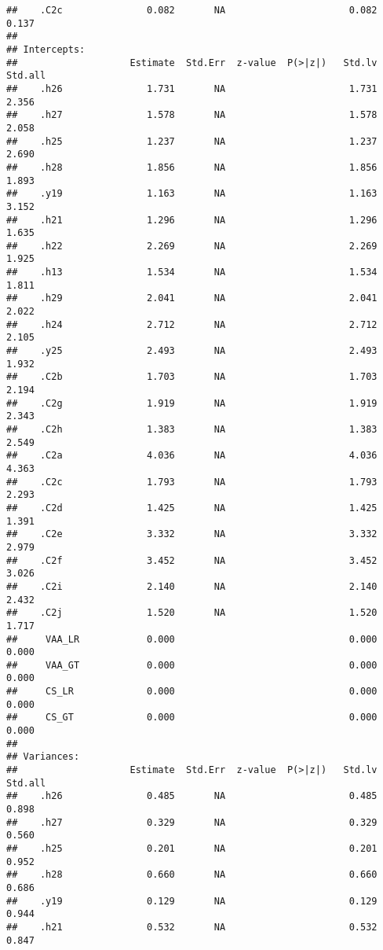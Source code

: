 \documentclass[
]{article}
\begin{document}
\begin{verbatim}
##    .C2c               0.082       NA                      0.082    0.137
## 
## Intercepts:
##                    Estimate  Std.Err  z-value  P(>|z|)   Std.lv  Std.all
##    .h26               1.731       NA                      1.731    2.356
##    .h27               1.578       NA                      1.578    2.058
##    .h25               1.237       NA                      1.237    2.690
##    .h28               1.856       NA                      1.856    1.893
##    .y19               1.163       NA                      1.163    3.152
##    .h21               1.296       NA                      1.296    1.635
##    .h22               2.269       NA                      2.269    1.925
##    .h13               1.534       NA                      1.534    1.811
##    .h29               2.041       NA                      2.041    2.022
##    .h24               2.712       NA                      2.712    2.105
##    .y25               2.493       NA                      2.493    1.932
##    .C2b               1.703       NA                      1.703    2.194
##    .C2g               1.919       NA                      1.919    2.343
##    .C2h               1.383       NA                      1.383    2.549
##    .C2a               4.036       NA                      4.036    4.363
##    .C2c               1.793       NA                      1.793    2.293
##    .C2d               1.425       NA                      1.425    1.391
##    .C2e               3.332       NA                      3.332    2.979
##    .C2f               3.452       NA                      3.452    3.026
##    .C2i               2.140       NA                      2.140    2.432
##    .C2j               1.520       NA                      1.520    1.717
##     VAA_LR            0.000                               0.000    0.000
##     VAA_GT            0.000                               0.000    0.000
##     CS_LR             0.000                               0.000    0.000
##     CS_GT             0.000                               0.000    0.000
## 
## Variances:
##                    Estimate  Std.Err  z-value  P(>|z|)   Std.lv  Std.all
##    .h26               0.485       NA                      0.485    0.898
##    .h27               0.329       NA                      0.329    0.560
##    .h25               0.201       NA                      0.201    0.952
##    .h28               0.660       NA                      0.660    0.686
##    .y19               0.129       NA                      0.129    0.944
##    .h21               0.532       NA                      0.532    0.847

\end{verbatim}
\end{document}
